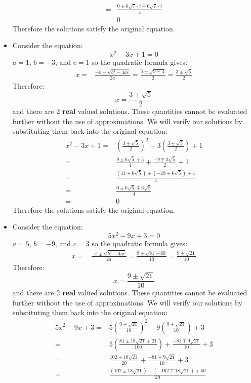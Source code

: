 \documentclass{article}
\begin{document}
\begin{itemize}
\begin{align*}
= & \frac{0 \pm 6\sqrt{7} \cdot i \mp 6\sqrt{7} \cdot i}{4} \\
= & 0
\end{align*}
Therefore the solutions satisfy the original equation.
\item Consider the equation: 
\[x^2 - 3x + 1 = 0\]
\(a = 1\), \(b = -3\), and \(c = 1\) so the quadratic formula gives:
\begin{align*}
x = & \frac{-b \pm \sqrt{b^2 - 4ac}}{2a} 
= \frac{3 \pm \sqrt{9 - 4}}{2} 
= \frac{3 \pm \sqrt{5}}{2}
\end{align*}
Therefore:
\[x = \frac{3 \pm \sqrt{5}}{2}\]
and there are 2 {\bf real} valued solutions. These quantities cannot be evaluated further without the use of approximations. We will verify our solutions by substituting them back into the original equation:
\begin{align*}
x^2 - 3x + 1 
= & \left(\frac{3 \pm \sqrt{5}}{2}\right)^2 - 3\left(\frac{3 \pm \sqrt{5}}{2}\right) + 1 \\
= & \frac{9 \pm 6\sqrt{5} + 5}{4} + \frac{-9 \mp 3\sqrt{5}}{2} + 1 \\
= & \frac{(14 \pm 6\sqrt{5}) + (-18 \mp 6\sqrt{5}) + 4}{4} \\
= & \frac{0 \pm 6\sqrt{5} \mp 6\sqrt{5}}{4} \\
= & 0 
\end{align*}
Therefore the solutions satisfy the original equation.
\item Consider the equation: 
\[5x^2 - 9x + 3 = 0\]
\(a = 5\), \(b = -9\), and \(c = 3\) so the quadratic formula gives:
\begin{align*}
x = & \frac{-b \pm \sqrt{b^2 - 4ac}}{2a} 
= \frac{9 \pm \sqrt{81 - 60}}{10} 
= \frac{9 \pm \sqrt{21}}{10}
\end{align*}
Therefore:
\[x = \frac{9 \pm \sqrt{21}}{10}\]
and there are 2 {\bf real} valued solutions. These quantities cannot be evaluated further without the use of approximations. We will verify our solutions by substituting them back into the original equation:
\begin{align*}
5x^2 - 9x + 3 
= & 5\left(\frac{9 \pm \sqrt{21}}{10}\right)^2 - 9\left(\frac{9 \pm \sqrt{21}}{10}\right) + 3 \\
= & 5\left(\frac{81 \pm 18\sqrt{21} + 21}{100}\right) + \frac{-81 \mp 9\sqrt{21}}{10} + 3 \\
= & \frac{102 \pm 18\sqrt{21}}{20} + \frac{-81 \mp 9\sqrt{21}}{10} + 3 \\
= & \frac{(102 \pm 18\sqrt{21}) + (-162 \mp 18\sqrt{21}) + 60}{20} \\

\end{align*}
\end{itemize}
\end{document}
